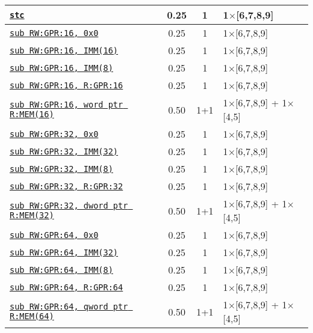\documentclass[a4paper,english,fontsize=9]{scrartcl}
\begin{document}
\begin{longtable}{p{}ccL{.25\textwidth}}
  \midrule
  \texttt{\href{https://felixcloutier.com/x86/STC.html}{stc}} & 0.25 & 1 & 1\(\times\)[6,7,8,9] \\
  \midrule
  \texttt{\href{https://felixcloutier.com/x86/SUB.html}{sub RW:GPR:16, 0x0}} & 0.25 & 1 & 1\(\times\)[6,7,8,9] \\
  \midrule
  \texttt{\href{https://felixcloutier.com/x86/SUB.html}{sub RW:GPR:16, IMM(16)}} & 0.25 & 1 & 1\(\times\)[6,7,8,9] \\
  \midrule
  \texttt{\href{https://felixcloutier.com/x86/SUB.html}{sub RW:GPR:16, IMM(8)}} & 0.25 & 1 & 1\(\times\)[6,7,8,9] \\
  \midrule
  \texttt{\href{https://felixcloutier.com/x86/SUB.html}{sub RW:GPR:16, R:GPR:16}} & 0.25 & 1 & 1\(\times\)[6,7,8,9] \\
  \midrule
  \texttt{\href{https://felixcloutier.com/x86/SUB.html}{sub RW:GPR:16, word ptr R:MEM(16)}} & 0.50 & 1+1 & 1\(\times\)[6,7,8,9] + 1\(\times\)[4,5] \\
  \midrule
  \texttt{\href{https://felixcloutier.com/x86/SUB.html}{sub RW:GPR:32, 0x0}} & 0.25 & 1 & 1\(\times\)[6,7,8,9] \\
  \midrule
  \texttt{\href{https://felixcloutier.com/x86/SUB.html}{sub RW:GPR:32, IMM(32)}} & 0.25 & 1 & 1\(\times\)[6,7,8,9] \\
  \midrule
  \texttt{\href{https://felixcloutier.com/x86/SUB.html}{sub RW:GPR:32, IMM(8)}} & 0.25 & 1 & 1\(\times\)[6,7,8,9] \\
  \midrule
  \texttt{\href{https://felixcloutier.com/x86/SUB.html}{sub RW:GPR:32, R:GPR:32}} & 0.25 & 1 & 1\(\times\)[6,7,8,9] \\
  \midrule
  \texttt{\href{https://felixcloutier.com/x86/SUB.html}{sub RW:GPR:32, dword ptr R:MEM(32)}} & 0.50 & 1+1 & 1\(\times\)[6,7,8,9] + 1\(\times\)[4,5] \\
  \midrule
  \texttt{\href{https://felixcloutier.com/x86/SUB.html}{sub RW:GPR:64, 0x0}} & 0.25 & 1 & 1\(\times\)[6,7,8,9] \\
  \midrule
  \texttt{\href{https://felixcloutier.com/x86/SUB.html}{sub RW:GPR:64, IMM(32)}} & 0.25 & 1 & 1\(\times\)[6,7,8,9] \\
  \midrule
  \texttt{\href{https://felixcloutier.com/x86/SUB.html}{sub RW:GPR:64, IMM(8)}} & 0.25 & 1 & 1\(\times\)[6,7,8,9] \\
  \midrule
  \texttt{\href{https://felixcloutier.com/x86/SUB.html}{sub RW:GPR:64, R:GPR:64}} & 0.25 & 1 & 1\(\times\)[6,7,8,9] \\
  \midrule
  \texttt{\href{https://felixcloutier.com/x86/SUB.html}{sub RW:GPR:64, qword ptr R:MEM(64)}} & 0.50 & 1+1 & 1\(\times\)[6,7,8,9] + 1\(\times\)[4,5] \\

\end{longtable}
\end{document}
